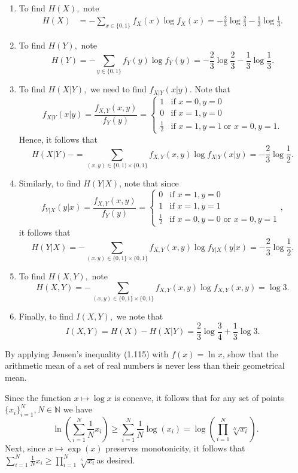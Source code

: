 \begin{enumerate}[leftmargin={*}]
\item To find $H(X),$ note 
\begin{align*}
H(X) & =-\sum_{x\in\{0,1\}}f_{X}(x)\log f_{X}(x)=-\frac{2}{3}\log\frac{2}{3}-\frac{1}{3}\log\frac{1}{3}.
\end{align*}
\item To find $H(Y),$ note 
\[
H(Y)=-\sum_{y\in\{0,1\}}f_{Y}(y)\log f_{Y}(y)=-\frac{2}{3}\log\frac{2}{3}-\frac{1}{3}\log\frac{1}{3}.
\]
\item To find $H(X\vert Y),$ we need to find $f_{X\vert Y}(x\vert y).$
Note that 
\[
f_{X\vert Y}(x\vert y)=\frac{f_{X,Y}(x,y)}{f_{Y}(y)}=\begin{cases}
1 & \text{if }x=0,y=0\\
0 & \text{if }x=1,y=0\\
\frac{1}{2} & \text{if }x=1,y=1\ \text{or }x=0,y=1.
\end{cases}
\]
Hence, it follows that 
\[
H(X\vert Y)-=\sum_{(x,y)\in\{0,1)\times\{0,1\}}f_{X,Y}(x,y)\log f_{X\vert Y}(x\vert y)=-\frac{2}{3}\log\frac{1}{2}.
\]
\item Similarly, to find $H(Y|X)$, note that since 
\[
f_{Y\vert X}(y|x)=\frac{f_{X,Y}(x,y)}{f_{Y}(y)}=\begin{cases}
0 & \text{if }x=1,y=0\\
1 & \text{if }x=1,y=1\\
\frac{1}{2} & \text{if }x=0,y=0\text{ or }x=0,y=1
\end{cases},
\]
it follows that 
\[
H(Y\vert X)=-\sum_{(x,y)\in\{0,1\}\times\{0,1\}}f_{X,Y}(x,y)\log f_{Y\vert X}(y\vert x)=-\frac{2}{3}\log\frac{1}{2}.
\]
\item To find $H(X,Y),$ note 
\[
H(X,Y)=-\sum_{(x,y)\in\{0,1\}\times\{0,1\}}f_{X,Y}(x,y)\log f_{X,Y}(x,y)=\log3.
\]
\item Finally, to find $I(X,Y),$ we note that 
\[
I(X,Y)=H(X)-H(X\vert Y)=\frac{2}{3}\log\frac{3}{4}+\frac{1}{3}\log3.
\]
\end{enumerate}
%
\begin{cBoxA}{}
 By applying Jensen\textquoteright s inequality (1.115) with $f(x)=\ln x$,
show that the arithmetic mean of a set of real numbers is never less
than their geometrical mean.
\end{cBoxA}

Since the function $x\mapsto\log x$ is concave, it follows that for
any set of points $\{x_{i}\}_{i=1}^{N},N\in\mathbb{N}$ we have 
\[
\ln\left(\sum_{i=1}^{N}\frac{1}{N}x_{i}\right)\geq\sum_{i=1}^{N}\frac{1}{N}\log(x_{i})=\log\left(\prod_{i=1}^{N}\sqrt[N]{x_{i}}\right).
\]
Next, since $x\mapsto\exp(x)$ preserves monotonicity, it follows
that $\sum_{i=1}^{N}\frac{1}{N}x_{i}\geq\prod_{i=1}^{N}\sqrt[^{N}]{x_{i}}$as
desired. \\

